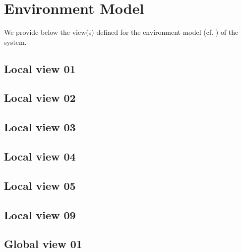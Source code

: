 \chapter{Environment Model}
\label{chap:lu.uni.lassy.excalibur.examples.icrash-EM}



We provide below the view(s) defined for the \msrmessir environment model (cf. \cite{messirbook}) of the system. 


\section{Local view 01}
\label{sec:lu.uni.lassy.excalibur.examples.icrash-EM-view-01-local}

\section{Local view 02}
\label{sec:lu.uni.lassy.excalibur.examples.icrash-EM-view-02-local}

\section{Local view 03}
\label{sec:lu.uni.lassy.excalibur.examples.icrash-EM-view-03-local}

\section{Local view 04}
\label{sec:lu.uni.lassy.excalibur.examples.icrash-EM-view-04-local}

\section{Local view 05}
\label{sec:lu.uni.lassy.excalibur.examples.icrash-EM-view-05-local}

\section{Local view 09}
\label{sec:lu.uni.lassy.excalibur.examples.icrash-EM-view-09-local}



\section{Global view 01}
\label{sec:lu.uni.lassy.excalibur.examples.icrash-EM-view-01-global}




